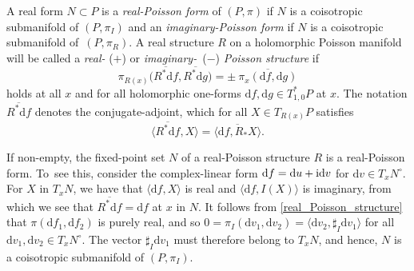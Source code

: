 \documentclass[pdftex]{sigma}
\numberwithin{equation}{section}
\begin{document}
\begin{Definition}
	A real form $N\subset P$ is a \emph{real-Poisson form} of $(P,\pi)$ if $N$ is a coisotropic submanifold of $(P,\pi_I)$ and an \emph{imaginary-Poisson form} if $N$ is a coisotropic submanifold of~$(P,\pi_R)$. A real structure $R$ on a holomorphic Poisson manifold will be called a \emph{real-} ($+$) or \emph{imaginary-}~($-$) \emph{Poisson structure} if
	\begin{equation}\label{real_Poisson_structure}
		\pi_{R(x)}\bigl(\overline{R^*\mathrm{d}f},\overline{R^*\mathrm{d}g}\bigr)=\pm~\overline{\pi_{x}(\mathrm{d}f,\mathrm{d}g)}
	\end{equation}
	holds at all $x$ and for all holomorphic one-forms $\mathrm{d}f,\mathrm{d}g\in T_{1,0}^*P$ at $x$. The notation $\overline{R^*\mathrm{d}f}$ denotes the conjugate-adjoint, which for all $X\in T_{R(x)}P$ satisfies
	\begin{equation}
		\label{conjugate_adjoint}
		\bigl\langle \overline{R^*\mathrm{d}f},X\bigr\rangle=\overline{\langle \mathrm{d}f,R_*X\rangle}.
	\end{equation}
	
\end{Definition}
If non-empty, the fixed-point set $N$ of a real-Poisson structure $R$ is a real-Poisson form. To~see this, consider the complex-linear form $\mathrm{d}f=\mathrm{d}u+{\rm i}\mathrm{d}v$ for $\mathrm{d}v\in T_xN^\circ$. For $X$ in $T_xN$, we have that $\langle \mathrm{d}f, X\rangle$ is real and $\langle \mathrm{d}f,I(X)\rangle$ is imaginary, from which we see that $\overline{R^*\mathrm{d}f}=\mathrm{d}f$ at $x$ in $N$. It follows from \eqref{real_Poisson_structure} that $\pi(\mathrm{d}f_1,\mathrm{d}f_2)$ is purely real, and so $0=\pi_I(\mathrm{d}v_1,\mathrm{d}v_2)=\langle \mathrm{d}v_2,\sharp_I \mathrm{d}v_1\rangle$ for all $\mathrm{d}v_1, \mathrm{d}v_2\in T_xN^\circ$. The vector $\sharp_I \mathrm{d}v_1$ must therefore belong to $T_xN$, and hence, $N$ is a coisotropic submanifold of $(P,\pi_I)$.
\end{document}
